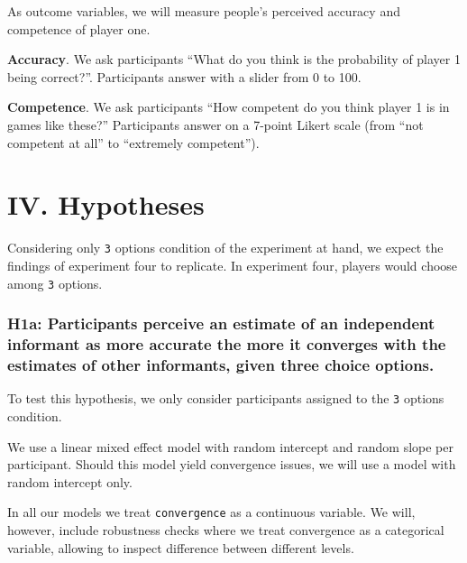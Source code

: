 \documentclass[
]{article}
\begin{document}
As outcome variables, we will measure people's perceived accuracy and
competence of player one.

\textbf{Accuracy}. We ask participants ``What do you think is the
probability of player 1 being correct?''. Participants answer with a
slider from 0 to 100.

\textbf{Competence}. We ask participants ``How competent do you think
player 1 is in games like these?'' Participants answer on a 7-point
Likert scale (from ``not competent at all'' to ``extremely competent'').

\hypertarget{iv.-hypotheses}{%
\section{IV. Hypotheses}\label{iv.-hypotheses}}

Considering only \texttt{3} options condition of the experiment at hand,
we expect the findings of experiment four to replicate. In experiment
four, players would choose among \texttt{3} options.

\hypertarget{h1a-participants-perceive-an-estimate-of-an-independent-informant-as-more-accurate-the-more-it-converges-with-the-estimates-of-other-informants-given-three-choice-options.}{%
\subsubsection{H1a: Participants perceive an estimate of an independent
informant as more accurate the more it converges with the estimates of
other informants, given three choice
options.}\label{h1a-participants-perceive-an-estimate-of-an-independent-informant-as-more-accurate-the-more-it-converges-with-the-estimates-of-other-informants-given-three-choice-options.}}

To test this hypothesis, we only consider participants assigned to the
\texttt{3} options condition.

We use a linear mixed effect model with random intercept and random
slope per participant. Should this model yield convergence issues, we
will use a model with random intercept only.

In all our models we treat \texttt{convergence} as a continuous
variable. We will, however, include robustness checks where we treat
convergence as a categorical variable, allowing to inspect difference
between different levels.
\end{document}
